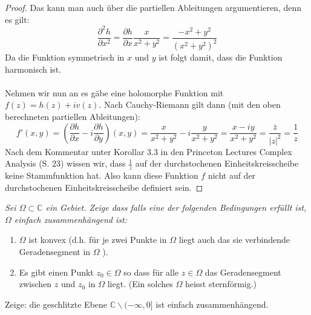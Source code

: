 \documentclass[11pt]{article}
\newenvironment{problem}[2][Beispiel]{
    \begin{trivlist}
        \item[\hskip \labelsep {\bfseries #1}\hskip \labelsep {\bfseries #2.}] \itshape}{
    \end{trivlist}\normalshape
}
\begin{document}
\begin{proof}
        Das kann man auch über die partiellen Ableitungen argumentieren, denn es gilt:
        $$\frac{\partial^2 h}{\partial x^2} =\frac{\partial h}{\partial x} \frac{x}{x^2+y^2} =
        \frac{-x^2+y^2}{(x^2+y^2)^2}$$
        Da die Funktion symmetrisch in $x$ und $y$ ist folgt damit, dass die Funktion harmonisch ist.\\\\
        Nehmen wir nun an es gäbe eine holomorphe Funktion mit $f(z) = h(z) + iv(z)$.
        Nach Cauchy-Riemann gilt dann (mit den oben berechneten partiellen Ableitungen):
        $$f'(x,y) = \left(\frac{\partial h}{\partial x}-i\frac{\partial h}{\partial y}\right)(x,y) =
        \frac{x}{x^2+y^2}-i\frac{y}{x^2+y^2} = \frac{x-iy}{x^2+y^2}=\frac{\bar{z}}{|z|^2} = \frac{1}{z}$$
        Nach dem Kommentar unter Korollar 3.3 in den Princeton Lectures Complex Analysis (S. 23) wissen
        wir, dass $\frac{1}{z}$ auf der durchstochenen Einheitskreisscheibe keine Stammfunktion
        hat. Also kann diese Funktion $f$ nicht auf der durchstochenen Einheitskreisscheibe
        definiert sein.
    \end{proof}

    \begin{problem}{2}
        Sei $\Omega \subset \mathbb{C}$ ein Gebiet. Zeige dass falls eine der folgenden Bedingungen
        erfüllt ist, $\Omega$ einfach zusammenhängend ist:
        \begin{enumerate}[label = (\alph*)]
            \item $\Omega$ ist konvex (d.h. für je zwei Punkte in $\Omega$ liegt auch das sie verbindende
        Geradensegment in $\Omega$ ).
            \item Es gibt einen Punkt $z_0 \in \Omega$ so dass für alle $z \in \Omega$ das Geradensegment zwischen
        $z$ und $z_0$ in $\Omega$ liegt. (Ein solches $\Omega$ heisst sternförmig.)
        \end{enumerate}
        Zeige: die geschlitzte Ebene $\mathbb{C} \backslash(-\infty, 0]$ ist einfach zusammenhängend.
    \end{problem}
\end{document}
